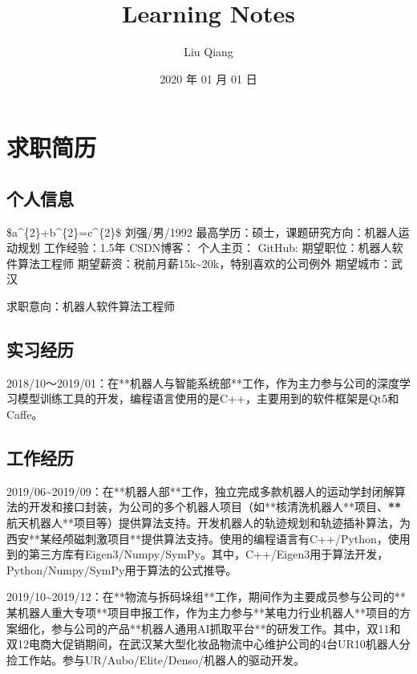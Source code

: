 \documentclass[letterpaper,10pt,english]{sphinxmanual}
\title{Learning Notes}
\date{2020 年 01 月 01 日}
\author{Liu Qiang}
\begin{document}
\pagestyle{empty}
\sphinxmaketitle
\pagestyle{plain}
\sphinxtableofcontents
\pagestyle{normal}
\label{\detokenize{index::doc}}



\chapter{求职简历}
\label{\detokenize{resume:id1}}\label{\detokenize{resume::doc}}

\section{个人信息}
\label{\detokenize{resume:id2}}
\$a\textasciicircum{}\{2\}+b\textasciicircum{}\{2\}=c\textasciicircum{}\{2\}\$
\sphinxhyphen{} 刘强/男/1992
\sphinxhyphen{} 最高学历：硕士，课题研究方向：机器人运动规划
\sphinxhyphen{} 工作经验：1.5年
\sphinxhyphen{} CSDN博客：
\sphinxhyphen{} 个人主页：
\sphinxhyphen{} GitHub:
\sphinxhyphen{} 期望职位：机器人软件算法工程师
\sphinxhyphen{} 期望薪资：税前月薪15k\textasciitilde{}20k，特别喜欢的公司例外
\sphinxhyphen{} 期望城市：武汉

求职意向：机器人软件算法工程师


\section{实习经历}
\label{\detokenize{resume:id3}}

2018/10～2019/01：在**机器人与智能系统部**工作，作为主力参与公司的深度学习模型训练工具的开发，编程语言使用的是C++，主要用到的软件框架是Qt5和Caffe。


\section{工作经历}
\label{\detokenize{resume:id4}}

2019/06\textasciitilde{}2019/09：在**机器人部**工作，独立完成多款机器人的运动学封闭解算法的开发和接口封装，为公司的多个机器人项目（如**核清洗机器人**项目、{\color{red}\bfseries{}**}航天机器人**项目等）提供算法支持。开发机器人的轨迹规划和轨迹插补算法，为西安**某经颅磁刺激项目**提供算法支持。使用的编程语言有C++/Python，使用到的第三方库有Eigen3/Numpy/SymPy。其中，C++/Eigen3用于算法开发，Python/Numpy/SymPy用于算法的公式推导。

2019/10\textasciitilde{}2019/12：在**物流与拆码垛组**工作，期间作为主要成员参与公司的**某机器人重大专项**项目申报工作，作为主力参与**某电力行业机器人**项目的方案细化，参与公司的产品**机器人通用AI抓取平台**的研发工作。其中，双11和双12电商大促销期间，在武汉某大型化妆品物流中心维护公司的4台UR10机器人分捡工作站。参与UR/Aubo/Elite/Denso/机器人的驱动开发。
\end{document}
